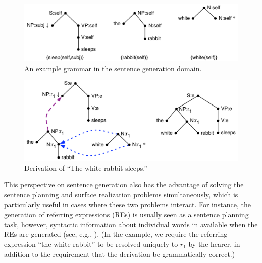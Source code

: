 \begin{figure}
  \centering
  \includegraphics[width=0.75\columnwidth]{pic-grammar}
  \caption{An example grammar in the sentence generation domain.}
  \label{fig:white-rabbit-sleeps-grammar}
\end{figure}

\begin{figure}
  \centering
  \includegraphics[width=0.75\columnwidth]{pic-derivation}
  \caption{Derivation of ``The white rabbit sleeps.''}
  \label{fig:white-rabbit-sleeps-deriv}
\end{figure}

This perspective on sentence generation also has the advantage of solving
the sentence planning and surface realization problems simultaneously,
which is particularly useful in cases where these two problems interact.
For instance, the generation of referring expressions (REs) is usually seen
as a sentence planning task, however, syntactic information about
individual words in available when the REs are generated (see, e.g.,
\citealt{stone98textual}). (In the example, we require the referring
expression ``the white rabbit'' to be resolved uniquely to $r_1$ by the
hearer, in addition to the requirement that the derivation be grammatically
correct.)


